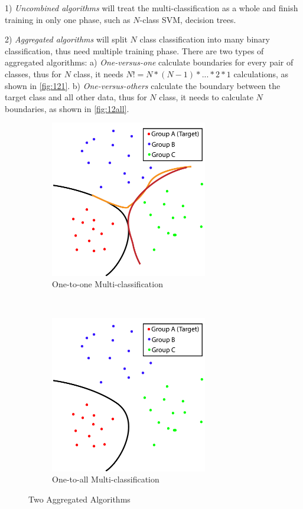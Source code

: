 \begin{spacing}{1.5}
1) \textit{Uncombined algorithms} will treat the multi-classification as a whole and finish training in only one phase, such as $N$-class SVM, decision trees. 

2) \textit{Aggregated algorithms} will split $N$ class classification into many binary classification, thus need multiple training phase. There are two types of aggregated algorithms: a) \textit{One-versus-one} calculate boundaries for every pair of classes, thus for $N$ class, it needs $N!=N*(N-1)*...*2*1$ calculations, as shown in \autoref{fig:121}. b) \textit{One-versus-others} calculate the boundary between the target class and all other data, thus for $N$ class, it needs to calculate $N$ boundaries, as shown in \autoref{fig:12all}. 

\begin{figure}[th]
    \centering
    \begin{subfigure}[b]{0.49\textwidth}
        \centering
        \includegraphics[width=2.7in, fbox]{Chapter2/1to1.pdf}
        \caption{One-to-one Multi-classification}
        \label{fig:121} 
    \end{subfigure}%
    ~
    \begin{subfigure}[b]{0.49\textwidth}
        \centering
        \includegraphics[width=2.7in, fbox]{Chapter2/1toall.pdf}
        \caption{One-to-all Multi-classification}
        \label{fig:12all} 
    \end{subfigure}
    \caption{Two Aggregated Algorithms}
\end{figure}



\end{spacing}
